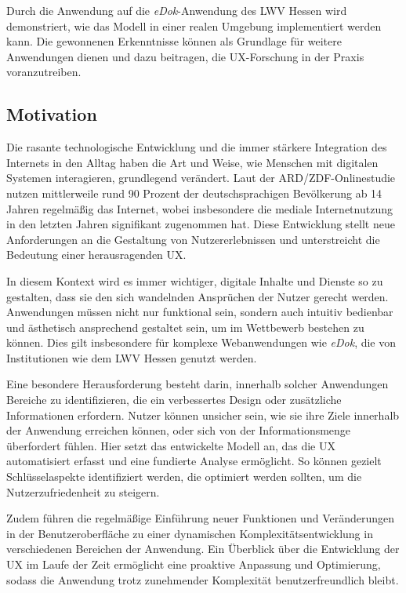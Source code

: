 \documentclass[12pt,oneside]{article}
\begin{document}
Durch die Anwendung auf die \textit{eDok}-Anwendung des LWV Hessen wird demonstriert, wie das Modell in einer realen Umgebung implementiert werden kann. Die gewonnenen Erkenntnisse können als Grundlage für weitere Anwendungen dienen und dazu beitragen, die UX-Forschung in der Praxis voranzutreiben.
\subsection{Motivation}

Die rasante technologische Entwicklung und die immer stärkere Integration des Internets in den Alltag haben die Art und Weise, wie Menschen mit digitalen Systemen interagieren, grundlegend verändert. Laut der ARD/ZDF-Onlinestudie \cite{ard} nutzen mittlerweile rund 90 Prozent der deutschsprachigen Bevölkerung ab 14 Jahren regelmäßig das Internet, wobei insbesondere die mediale Internetnutzung in den letzten Jahren signifikant zugenommen hat. Diese Entwicklung stellt neue Anforderungen an die Gestaltung von Nutzererlebnissen und unterstreicht die Bedeutung einer herausragenden UX.

In diesem Kontext wird es immer wichtiger, digitale Inhalte und Dienste so zu gestalten, dass sie den sich wandelnden Ansprüchen der Nutzer gerecht werden. Anwendungen müssen nicht nur funktional sein, sondern auch intuitiv bedienbar und ästhetisch ansprechend gestaltet sein, um im Wettbewerb bestehen zu können. Dies gilt insbesondere für komplexe Webanwendungen wie \textit{eDok}, die von Institutionen wie dem LWV Hessen genutzt werden.

Eine besondere Herausforderung besteht darin, innerhalb solcher Anwendungen Bereiche zu identifizieren, die ein verbessertes Design oder zusätzliche Informationen erfordern. Nutzer können unsicher sein, wie sie ihre Ziele innerhalb der Anwendung erreichen können, oder sich von der Informationsmenge überfordert fühlen. Hier setzt das entwickelte Modell an, das die UX automatisiert erfasst und eine fundierte Analyse ermöglicht. So können gezielt Schlüsselaspekte identifiziert werden, die optimiert werden sollten, um die Nutzerzufriedenheit zu steigern.

Zudem führen die regelmäßige Einführung neuer Funktionen und Veränderungen in der Benutzeroberfläche zu einer dynamischen Komplexitätsentwicklung in verschiedenen Bereichen der Anwendung. Ein Überblick über die Entwicklung der UX im Laufe der Zeit ermöglicht eine proaktive Anpassung und Optimierung, sodass die Anwendung trotz zunehmender Komplexität benutzerfreundlich bleibt.
\end{document}
